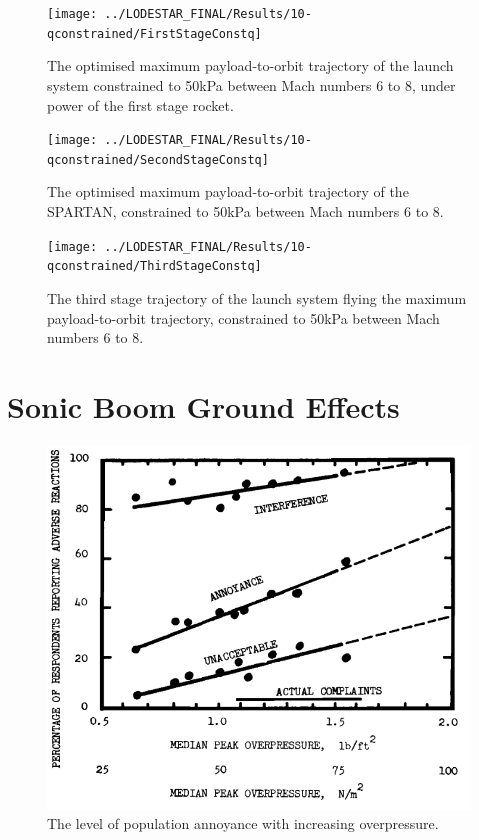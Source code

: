 \begin{figure}[th]
\centering
\texttt{[image: ../LODESTAR\_FINAL/Results/10-qconstrained/FirstStageConstq]}
\caption{The optimised maximum payload-to-orbit trajectory of the launch system constrained to 50kPa between Mach numbers 6 to 8, under power of the first stage rocket.}
\label{fig:FirstStageqConstrained68}
\end{figure}
		
\begin{figure}[th]
\centering
\texttt{[image: ../LODESTAR\_FINAL/Results/10-qconstrained/SecondStageConstq]}
\caption{The optimised maximum payload-to-orbit trajectory of the SPARTAN, constrained to 50kPa between Mach numbers 6 to 8.}
\label{fig:SecondStageqConstrained68}
\end{figure}

\begin{figure}[th]
\centering
\texttt{[image: ../LODESTAR\_FINAL/Results/10-qconstrained/ThirdStageConstq]}
\caption{The third stage trajectory of the launch system flying the maximum payload-to-orbit trajectory, constrained to 50kPa between Mach numbers 6 to 8.}
\label{fig:ThirdStageqConstrained68}
\end{figure}










\section{Sonic Boom Ground Effects}
\begin{figure}[ht]
	\centering
	\includegraphics[width=0.6\linewidth]{figures/6_FlyBack/OverPressureResponse}
	\caption{The level of population annoyance with increasing overpressure.}
	\label{fig:OverPressureResponse}
\end{figure}

